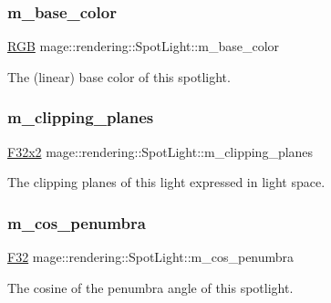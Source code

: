 \subsubsection{\texorpdfstring{m\+\_\+base\+\_\+color}{m\_base\_color}}
{\footnotesize\ttfamily \hyperlink{structmage_1_1_r_g_b}{R\+GB} mage\+::rendering\+::\+Spot\+Light\+::m\+\_\+base\+\_\+color\hspace{0.3cm}{\ttfamily [private]}}

The (linear) base color of this spotlight. \hypertarget{classmage_1_1rendering_1_1_spot_light_af709cc21c1f383868371156e0600fdc7}{}\label{classmage_1_1rendering_1_1_spot_light_af709cc21c1f383868371156e0600fdc7} 
\subsubsection{\texorpdfstring{m\+\_\+clipping\+\_\+planes}{m\_clipping\_planes}}
{\footnotesize\ttfamily \hyperlink{namespacemage_aa87237ad091f5cd7da612b8523fc108f}{F32x2} mage\+::rendering\+::\+Spot\+Light\+::m\+\_\+clipping\+\_\+planes\hspace{0.3cm}{\ttfamily [private]}}

The clipping planes of this light expressed in light space. \hypertarget{classmage_1_1rendering_1_1_spot_light_afcac44663ee8e8773eaa838ddbf9c0f2}{}\label{classmage_1_1rendering_1_1_spot_light_afcac44663ee8e8773eaa838ddbf9c0f2} 
\subsubsection{\texorpdfstring{m\+\_\+cos\+\_\+penumbra}{m\_cos\_penumbra}}
{\footnotesize\ttfamily \hyperlink{namespacemage_aa97e833b45f06d60a0a9c4fc22ae02c0}{F32} mage\+::rendering\+::\+Spot\+Light\+::m\+\_\+cos\+\_\+penumbra\hspace{0.3cm}{\ttfamily [private]}}

The cosine of the penumbra angle of this spotlight. \hypertarget{classmage_1_1rendering_1_1_spot_light_a2152cbea4f216f8ae18550a8c9e5b5e0}{}\label{classmage_1_1rendering_1_1_spot_light_a2152cbea4f216f8ae18550a8c9e5b5e0} 

